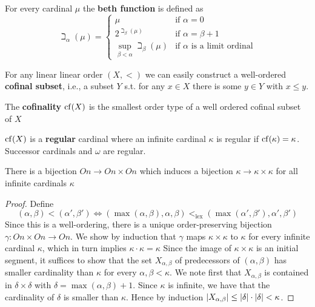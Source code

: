 \documentclass[11pt]{article}
\begin{document}
For every cardinal \(\mu\) the \textbf{beth function} is defined as
\begin{equation*}
\beth_\alpha(\mu)=
\begin{cases}
\mu&\text{if }\alpha=0\\
2^{\beth_\beta(\mu)}&\text{if }\alpha=\beta+1\\
\sup_{\beta<\alpha}\beth_\beta(\mu)&\text{if $\alpha$ is a limit ordinal}
\end{cases}
\end{equation*}

For any linear linear order \((X,<)\) we can easily construct a well-ordered \textbf{cofinal subset},
i.e., a subset \(Y\) s.t. for any \(x\in X\) there is some \(y\in Y\) with \(x\le y\).

\begin{definition}[]
The \textbf{cofinality} \(\operatorname{cf}(X)\) is the smallest order type of a well ordered cofinal subset of \(X\)
\end{definition}

\(\operatorname{cf}(X)\) is a \textbf{regular} cardinal where an infinite cardinal \(\kappa\) is regular if \(\operatorname{cf}(\kappa)=\kappa\).
Successor cardinals and \(\omega\) are regular.

\begin{lemma}
\label{lemmaA.3.7}
There is a bijection \(On\to On\times On\) which induces a bijection \(\kappa\to\kappa\times\kappa\) for all infinite
cardinals \(\kappa\)
\end{lemma}

\begin{proof}
Define
\begin{equation*}
(\alpha,\beta)<(\alpha',\beta')\Leftrightarrow(\max(\alpha,\beta),\alpha,\beta)<_{\text{lex}}(\max(\alpha',\beta'),\alpha',\beta')
\end{equation*}
Since this is a well-ordering, there is a unique order-preserving bijection \(\gamma:On\times On\to On\).
We show by induction that \(\gamma\) maps \(\kappa\times\kappa\) to \(\kappa\) for every infinite cardinal \(\kappa\), which in turn
implies \(\kappa\cdot\kappa=\kappa\) Since the image of \(\kappa\times\kappa\) is an initial segment, it suffices to show that the
set \(X_{\alpha,\beta}\) of predecessors of \((\alpha,\beta)\) has smaller cardinality than \(\kappa\) for every \(\alpha,\beta<\kappa\).
We note first that \(X_{\alpha,\beta}\) is contained in \(\delta\times\delta\) with \(\delta=\max(\alpha,\beta)+1\). Since \(\kappa\) is
infinite, we have that the cardinality of \(\delta\) is smaller than \(\kappa\). Hence by
induction \(\abs{X_{\alpha,\beta}}\le\abs{\delta}\cdot\abs{\delta}<\kappa\).
\end{proof}
\end{document}
